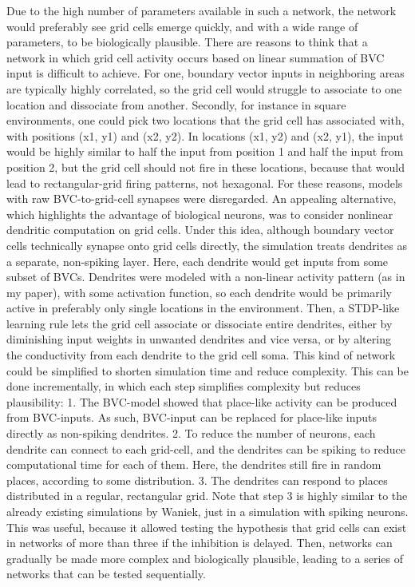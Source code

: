 \documentclass{article}
\begin{document}
    Due to the high number of parameters available in such a network, the network would preferably see grid cells emerge quickly, and with a wide range of parameters, to be biologically plausible. There are reasons to think that a network in which grid cell activity occurs based on linear summation of BVC input is difficult to achieve. For one, boundary vector inputs in neighboring areas are typically highly correlated, so the grid cell would struggle to associate to one location and dissociate from another. Secondly, for instance in square environments, one could pick two locations that the grid cell has associated with, with positions (x1, y1) and (x2, y2). In locations (x1, y2) and (x2, y1), the input would be highly similar to half the input from position 1 and half the input from position 2, but the grid cell should not fire in these locations, because that would lead to rectangular-grid firing patterns, not hexagonal. For these reasons, models with raw BVC-to-grid-cell synapses were disregarded.
    An appealing alternative, which highlights the advantage of biological neurons, was to consider nonlinear dendritic computation on grid cells. Under this idea, although boundary vector cells technically synapse onto grid cells directly, the simulation treats dendrites as a separate, non-spiking layer. Here, each dendrite would get inputs from some subset of BVCs. Dendrites were modeled with a non-linear activity pattern (as in my paper), with some activation function, so each dendrite would be primarily active in preferably only single locations in the environment. Then, a STDP-like learning rule lets the grid cell associate or dissociate entire dendrites, either by diminishing input weights in unwanted dendrites and vice versa, or by altering the conductivity from each dendrite to the grid cell soma.
    This kind of network could be simplified to shorten simulation time and reduce complexity. This can be done incrementally, in which each step simplifies complexity but reduces plausibility:
    1. The BVC-model showed that place-like activity can be produced from BVC-inputs. As such, BVC-input can be replaced for place-like inputs directly as non-spiking dendrites. 
    2. To reduce the number of neurons, each dendrite can connect to each grid-cell, and the dendrites can be spiking to reduce computational time for each of them. Here, the dendrites still fire in random places, according to some distribution.
    3. The dendrites can respond to places distributed in a regular, rectangular grid.
    Note that step 3 is highly similar to the already existing simulations by Waniek, just in a simulation with spiking neurons. This was useful, because it allowed testing the hypothesis that grid cells can exist in networks of more than three if the inhibition is delayed. Then, networks can gradually be made more complex and biologically plausible, leading to a series of networks that can be tested sequentially.
\end{document}
